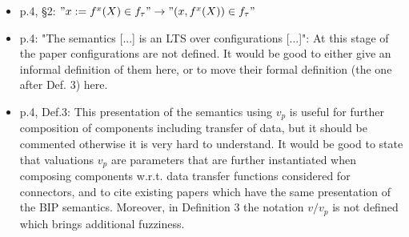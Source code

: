 \begin{itemize}
\item p.4, §2: $"x := f^x(X) \in f_{\tau}" \rightarrow "(x,f^x(X)) \in f_{\tau}"$
\done

\item p.4: "The semantics [...] is an LTS over configurations [...]": At this 
stage of the paper configurations are not defined. It would be good to either 
give an informal definition of them here, or to move their formal definition 
(the one after Def. 3) here.
\done


\item p.4, Def.3: This presentation of the semantics using $v_p$ is useful for 
further composition of components including transfer of data, but it should 
be commented otherwise it is very hard to understand. It would be good to 
state that valuations $v_p$ are parameters that are further instantiated when 
composing components w.r.t. data transfer functions considered for 
connectors, and to cite existing papers which have the same presentation of 
the BIP semantics. Moreover, in Definition 3 the notation $v/v_p$ is not 
defined which brings additional fuzziness.



\end{itemize}
